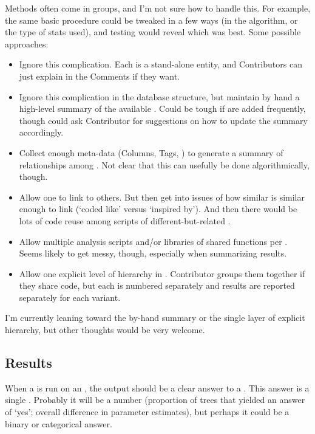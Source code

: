 Methods often come in groups, and I'm not sure how to handle this.
For example, the same basic procedure could be tweaked in a few ways (in the algorithm, or the type of stats used), and testing would reveal which was best.
Some possible approaches:
\begin{itemize}
    \item Ignore this complication.
          Each \Method is a stand-alone entity, and Contributors can just explain in the Comments if they want.
    \item Ignore this complication in the database structure, but maintain by hand a high-level summary of the available \Methods.
          Could be tough if \Methods are added frequently, though could ask Contributor for suggestions on how to update the summary accordingly.
    \item Collect enough meta-data (Columns, Tags, \etc) to generate a summary of relationships among \Methods.
          Not clear that this can usefully be done algorithmically, though.
    \item Allow one \Method to link to others.
          But then get into issues of how similar is similar enough to link (\eg `coded like' versus `inspired by').
          And then there would be lots of code reuse among scripts of different-but-related \Methods.
    \item Allow multiple analysis scripts and/or libraries of shared functions per \Method.
          Seems likely to get messy, though, especially when summarizing results.
    \item Allow one explicit level of hierarchy in \Methods.
          Contributor groups them together if they share code, but each is numbered separately and results are reported separately for each variant.
\end{itemize}

I'm currently leaning toward the by-hand summary or the single layer of explicit hierarchy, but other thoughts would be very welcome.

\subsection{Results}
\label{sec:tables_results}

When a \Method is run on an \Element, the output should be a clear answer to a \Task.
This answer is a single \Result.
Probably it will be a number (\eg proportion of trees that yielded an answer of `yes'; overall difference in parameter estimates), but perhaps it could be a binary or categorical answer.

